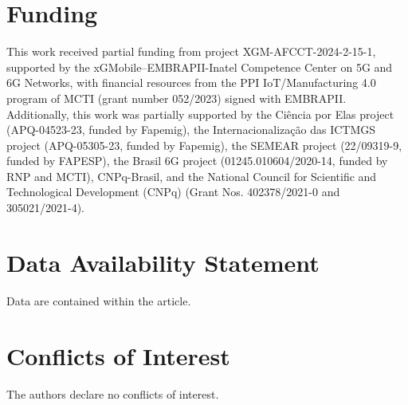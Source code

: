 \documentclass[conference]{IEEEtran}
\begin{document}
\section*{Funding}
This work received partial funding from project XGM-AFCCT-2024-2-15-1, supported by the xGMobile--EMBRAPII-Inatel Competence Center on 5G and 6G Networks, with financial resources from the PPI IoT/Manufacturing 4.0 program of MCTI (grant number 052/2023) signed with EMBRAPII. Additionally, this work was partially supported by the Ci\^encia por Elas project (APQ-04523-23, funded by Fapemig), the Internacionaliza\c{c}\~ao das ICTMGS project (APQ-05305-23, funded by Fapemig), the SEMEAR project (22/09319-9, funded by FAPESP), the Brasil 6G project (01245.010604/2020-14, funded by RNP and MCTI), CNPq-Brasil, and the National Council for Scientific and Technological Development (CNPq) (Grant Nos. 402378/2021-0 and 305021/2021-4).

\section*{Data Availability Statement}
Data are contained within the article.

\section*{Conflicts of Interest}
The authors declare no conflicts of interest.
\end{document}
